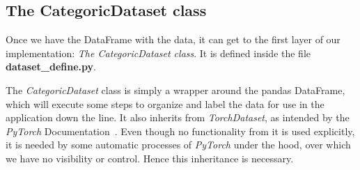 \documentclass[a4paper, 11pt]{report}
\begin{document}
   \subsection{The CategoricDataset class}
   Once we have the DataFrame with the data, it can get to the first layer of our implementation: \textit{The CategoricDataset class}. It is defined inside the file \textbf{dataset\_define.py}.

   The \textit{CategoricDataset} class is simply a wrapper around the pandas DataFrame, which will execute some steps to organize and label the data for use in the application down the line. It also inherits from \textit{TorchDataset}, as intended by the \textit{PyTorch} Documentation~\cite{pytorch_usermanual}. Even though no functionality from it is used explicitly, it is needed by some automatic processes of \textit{PyTorch} under the hood, over which we have no visibility or control. Hence this inheritance is necessary.
\end{document}
